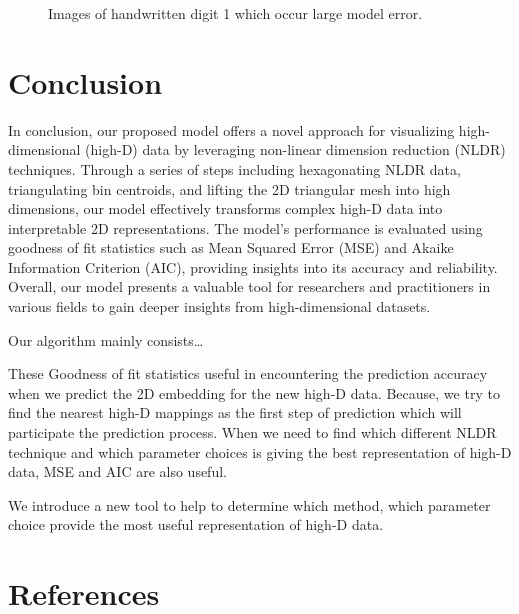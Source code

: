 \documentclass[
  12pt]{article}
\begin{document}
\begin{figure}[H]


\caption{\label{fig-sampleimgerror}Images of handwritten digit 1 which
occur large model error.}

\end{figure}%

\section{Conclusion}\label{sec-conclusions}

In conclusion, our proposed model offers a novel approach for
visualizing high-dimensional (high-D) data by leveraging non-linear
dimension reduction (NLDR) techniques. Through a series of steps
including hexagonating NLDR data, triangulating bin centroids, and
lifting the 2D triangular mesh into high dimensions, our model
effectively transforms complex high-D data into interpretable 2D
representations. The model's performance is evaluated using goodness of
fit statistics such as Mean Squared Error (MSE) and Akaike Information
Criterion (AIC), providing insights into its accuracy and reliability.
Overall, our model presents a valuable tool for researchers and
practitioners in various fields to gain deeper insights from
high-dimensional datasets.

Our algorithm mainly consists\ldots{}

These Goodness of fit statistics useful in encountering the prediction
accuracy when we predict the 2D embedding for the new high-D data.
Because, we try to find the nearest high-D mappings as the first step of
prediction which will participate the prediction process. When we need
to find which different NLDR technique and which parameter choices is
giving the best representation of high-D data, MSE and AIC are also
useful.

We introduce a new tool to help to determine which method, which
parameter choice provide the most useful representation of high-D data.

\section*{References}\label{references}

\renewcommand{\bibsection}{}


\newpage{}
\end{document}
